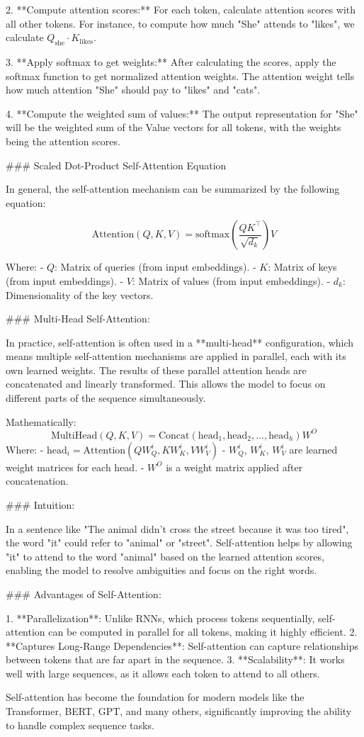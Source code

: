 2. **Compute attention scores:**
   For each token, calculate attention scores with all other tokens. For instance, to compute how much "She" attends to "likes", we calculate \(Q_{\text{she}} \cdot K_{\text{likes}}\).

3. **Apply softmax to get weights:**
   After calculating the scores, apply the softmax function to get normalized attention weights. The attention weight tells how much attention "She" should pay to "likes" and "cats".

4. **Compute the weighted sum of values:**
   The output representation for "She" will be the weighted sum of the Value vectors for all tokens, with the weights being the attention scores.

### Scaled Dot-Product Self-Attention Equation

In general, the self-attention mechanism can be summarized by the following equation:

\[
\text{Attention}(Q, K, V) = \text{softmax}\left(\frac{Q K^\top}{\sqrt{d_k}}\right) V
\]

Where:
- \(Q\): Matrix of queries (from input embeddings).
- \(K\): Matrix of keys (from input embeddings).
- \(V\): Matrix of values (from input embeddings).
- \(d_k\): Dimensionality of the key vectors.

### Multi-Head Self-Attention:

In practice, self-attention is often used in a **multi-head** configuration, which means multiple self-attention mechanisms are applied in parallel, each with its own learned weights. The results of these parallel attention heads are concatenated and linearly transformed. This allows the model to focus on different parts of the sequence simultaneously.

Mathematically:
\[
\text{MultiHead}(Q, K, V) = \text{Concat}(\text{head}_1, \text{head}_2, \ldots, \text{head}_h)W^O
\]
Where:
- \(\text{head}_i = \text{Attention}(QW_Q^i, KW_K^i, VW_V^i)\)
- \(W_Q^i\), \(W_K^i\), \(W_V^i\) are learned weight matrices for each head.
- \(W^O\) is a weight matrix applied after concatenation.

### Intuition:

In a sentence like "The animal didn't cross the street because it was too tired", the word "it" could refer to "animal" or "street". Self-attention helps by allowing "it" to attend to the word "animal" based on the learned attention scores, enabling the model to resolve ambiguities and focus on the right words.

### Advantages of Self-Attention:

1. **Parallelization**: Unlike RNNs, which process tokens sequentially, self-attention can be computed in parallel for all tokens, making it highly efficient.
2. **Captures Long-Range Dependencies**: Self-attention can capture relationships between tokens that are far apart in the sequence.
3. **Scalability**: It works well with large sequences, as it allows each token to attend to all others.

Self-attention has become the foundation for modern models like the Transformer, BERT, GPT, and many others, significantly improving the ability to handle complex sequence tasks.



